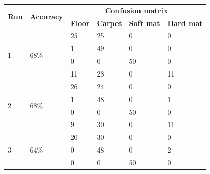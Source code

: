 \documentclass[USenglish]{ifimaster}  %
\begin{document}
	\begin{table}[h]
		\centering
		\begin{tabular}{@{}llllll@{}}
			\toprule
			\multirow{2}{*}{\textbf{Run}} & \multirow{2}{*}{\textbf{Accuracy}} & \multicolumn{4}{c}{\textbf{Confusion matrix}} \\ \cmidrule(l){3-6} 
			&  & \multicolumn{1}{l|}{\textbf{Floor}} & \multicolumn{1}{l|}{\textbf{Carpet}} & \multicolumn{1}{l|}{\textbf{Soft mat}} & \textbf{Hard mat} \\ \midrule
			\multicolumn{1}{l|}{\multirow{4}{*}{1}} & \multicolumn{1}{l|}{\multirow{4}{*}{68\%}} & \multicolumn{1}{l|}{25} & \multicolumn{1}{l|}{25} & \multicolumn{1}{l|}{0} & 0 \\ \cmidrule(l){3-6} 
			\multicolumn{1}{l|}{} & \multicolumn{1}{l|}{} & \multicolumn{1}{l|}{1} & \multicolumn{1}{l|}{49} & \multicolumn{1}{l|}{0} & 0 \\ \cmidrule(l){3-6} 
			\multicolumn{1}{l|}{} & \multicolumn{1}{l|}{} & \multicolumn{1}{l|}{0} & \multicolumn{1}{l|}{0} & \multicolumn{1}{l|}{50} & 0 \\ \cmidrule(l){3-6} 
			\multicolumn{1}{l|}{} & \multicolumn{1}{l|}{} & \multicolumn{1}{l|}{11} & \multicolumn{1}{l|}{28} & \multicolumn{1}{l|}{0} & 11 \\ \midrule
			\multicolumn{1}{l|}{\multirow{4}{*}{2}} & \multicolumn{1}{l|}{\multirow{4}{*}{68\%}} & \multicolumn{1}{l|}{26} & \multicolumn{1}{l|}{24} & \multicolumn{1}{l|}{0} & 0 \\ \cmidrule(l){3-6} 
			\multicolumn{1}{l|}{} & \multicolumn{1}{l|}{} & \multicolumn{1}{l|}{1} & \multicolumn{1}{l|}{48} & \multicolumn{1}{l|}{0} & 1 \\ \cmidrule(l){3-6} 
			\multicolumn{1}{l|}{} & \multicolumn{1}{l|}{} & \multicolumn{1}{l|}{0} & \multicolumn{1}{l|}{0} & \multicolumn{1}{l|}{50} & 0 \\ \cmidrule(l){3-6} 
			\multicolumn{1}{l|}{} & \multicolumn{1}{l|}{} & \multicolumn{1}{l|}{9} & \multicolumn{1}{l|}{30} & \multicolumn{1}{l|}{0} & 11 \\ \midrule
			\multicolumn{1}{l|}{\multirow{4}{*}{3}} & \multicolumn{1}{l|}{\multirow{4}{*}{64\%}} & \multicolumn{1}{l|}{20} & \multicolumn{1}{l|}{30} & \multicolumn{1}{l|}{0} & 0 \\ \cmidrule(l){3-6} 
			\multicolumn{1}{l|}{} & \multicolumn{1}{l|}{} & \multicolumn{1}{l|}{0} & \multicolumn{1}{l|}{48} & \multicolumn{1}{l|}{0} & 2 \\ \cmidrule(l){3-6} 
			\multicolumn{1}{l|}{} & \multicolumn{1}{l|}{} & \multicolumn{1}{l|}{0} & \multicolumn{1}{l|}{0} & \multicolumn{1}{l|}{50} & 0 \\ \cmidrule(l){3-6} 

\end{tabular}
\end{table}
\end{document}
